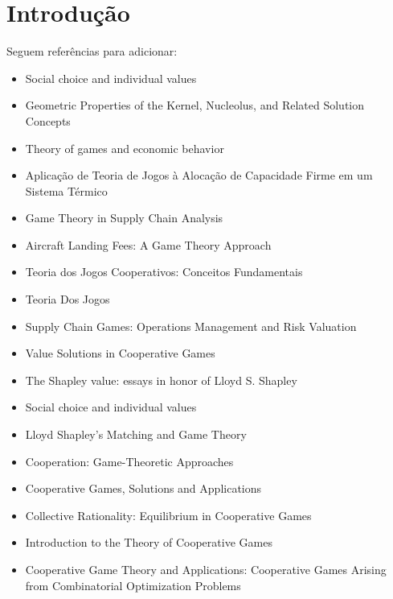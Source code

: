 \documentclass[
	article,			        %
	11pt,				          %
	oneside,			        %
	a4paper,			        %
	english,			        %
	brazil,				        %
	sumario=tradicional
]{abntex2}\usepackage[]{graphicx}\usepackage[]{color}
\begin{document}
\section*{Introdução}

Seguem referências para adicionar:\\

\begin{itemize}
  \item Social choice and individual values \cite{Figueiredo.1994}
  \item Geometric Properties of the Kernel, Nucleolus, and Related Solution Concepts \cite{Maschler.1979}
  \item Theory of games and economic behavior \cite{Neumann.1947}
  \item Aplicação de Teoria de Jogos à Alocação de Capacidade Firme em um Sistema Térmico \cite{Ayala.2008}
  \item Game Theory in Supply Chain Analysis \cite{Cachon.2004}
  \item Aircraft Landing Fees: A Game Theory Approach \cite{Littlechild.1977}
  \item Teoria dos Jogos Cooperativos: Conceitos Fundamentais \cite{Moreira.2002}
  \item Teoria Dos Jogos \cite{Fiani.2006}
  \item Supply Chain Games: Operations Management and Risk Valuation \cite{kogan.2007}
  \item Value Solutions in Cooperative Games \cite{Mccain.2013} 
  \item The Shapley value: essays in honor of Lloyd S. Shapley \cite{Alvin.1988}
  \item Social choice and individual values \cite{Arrow.2012}
  \item Lloyd Shapley's Matching and Game Theory \cite{Serrano.2013}
  \item Cooperation: Game-Theoretic Approaches \cite{Hart.2012}
  \item Cooperative Games, Solutions and Applications \cite{Driessen.2013}
  \item Collective Rationality: Equilibrium in Cooperative Games \cite{Weirich.2009}
  \item Introduction to the Theory of Cooperative Games \cite{Peleg.2007}
  \item Cooperative Game Theory and Applications: Cooperative Games Arising from Combinatorial Optimization Problems \cite{Curiel.2013}

\end{itemize}
\end{document}
